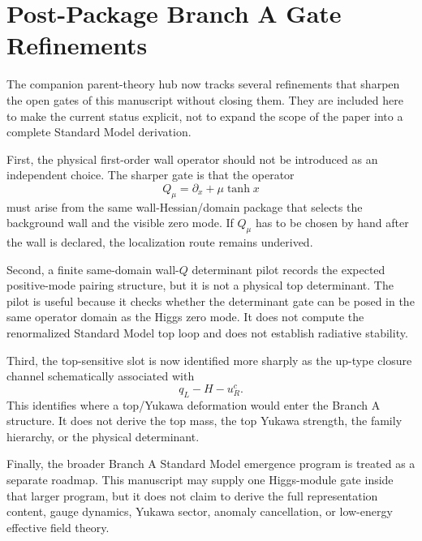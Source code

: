 \documentclass[11pt]{article}
\begin{document}
\section{Post-Package Branch A Gate Refinements}
The companion parent-theory hub now tracks several refinements that sharpen the
open gates of this manuscript without closing them.  They are included here to
make the current status explicit, not to expand the scope of the paper into a
complete Standard Model derivation.

First, the physical first-order wall operator should not be introduced as an
independent choice.  The sharper gate is that the operator
\begin{equation}
Q_\mu=\partial_x+\mu\tanh x
\end{equation}
must arise from the same wall-Hessian/domain package that selects the
background wall and the visible zero mode.  If $Q_\mu$ has to be chosen by hand
after the wall is declared, the localization route remains underived.

Second, a finite same-domain wall-$Q$ determinant pilot records the expected
positive-mode pairing structure, but it is not a physical top determinant.  The
pilot is useful because it checks whether the determinant gate can be posed in
the same operator domain as the Higgs zero mode.  It does not compute the
renormalized Standard Model top loop and does not establish radiative
stability.

Third, the top-sensitive slot is now identified more sharply as the up-type
closure channel schematically associated with
\begin{equation}
q_L-H-u_R^c .
\end{equation}
This identifies where a top/Yukawa deformation would enter the Branch A
structure.  It does not derive the top mass, the top Yukawa strength, the
family hierarchy, or the physical determinant.

Finally, the broader Branch A Standard Model emergence program is treated as a
separate roadmap.  This manuscript may supply one Higgs-module gate inside that
larger program, but it does not claim to derive the full representation
content, gauge dynamics, Yukawa sector, anomaly cancellation, or low-energy
effective field theory.
\end{document}
